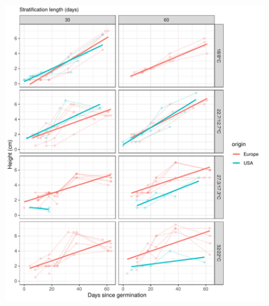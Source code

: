 \documentclass[12pt]{article}\usepackage[]{graphicx}\usepackage[]{color}
\begin{document}
\begin{figure}[H]
  {\includegraphics[scale=.5, page=4, trim=0cm 0cm 2.9cm 0cm, clip=TRUE]{supplement.pdf}}
\end{figure}
\end{document}
